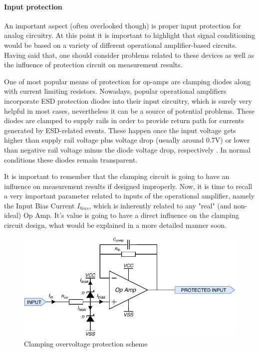 \documentclass[12pt,a4paper]{article}
\begin{document}
\paragraph{Input protection}
An important aspect (often overlooked though) is proper input protection for analog circuitry. At this point it is important to highlight that signal conditioning would be based on a variety of different operational amplifier-based circuits. Having said that, one should consider problems related to these devices as well as the influence of protection circuit on measurement results.
\par

One of most popular means of protection for op-amps are clamping diodes along with current limiting resistors. Nowadays, popular operational amplifiers incorporate ESD protection diodes into their input circuitry, which is surely very helpful in most cases, nevertheless it can be a source of potential problems. These diodes are clamped to supply rails in order to provide return path for currents generated by ESD-related events. These happen once the input voltage gets higher than supply rail voltage plus voltage drop (usually around 0.7V) or lower than negative rail voltage minus the diode voltage drop, respectively \cite{clamping}. In normal conditions these diodes remain transparent. 
\par

It is important to remember that the clamping circuit is going to have an influence on measurement results if designed improperly. Now, it is time to recall a very important parameter related to inputs of the operational amplifier, namely the Input Bias Current $I_{bias}$, which is inherently related to any "real" (and non-ideal) Op Amp. It's value is going to have a direct influence on the clamping circuit design, what would be explained in a more detailed manner soon.
\par

\begin{figure}[ht!]
\includegraphics[scale=1.2]{input1.pdf}
\caption{Clamping overvoltage protection scheme}
\label{fig:input1}
\end{figure}
\end{document}
